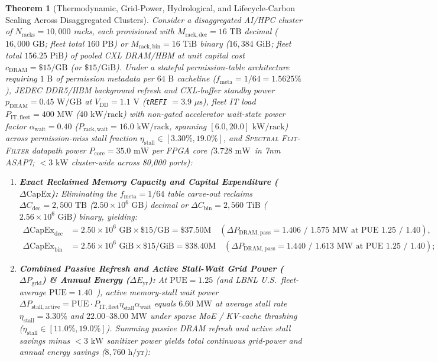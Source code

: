 \documentclass[10pt,twocolumn]{article}
\providecommand{\AsicTotalPowerMw}{\ensuremath{3.728\text{~mW}}}
\theoremstyle{spectralthm}
\newtheorem{theorem}{Theorem}[section]
\begin{document}
\begin{theorem}[Thermodynamic, Grid-Power, Hydrological, and Lifecycle-Carbon Scaling Across Disaggregated Clusters]
\label{thm:thermo_env}
\label{thm:cluster_thermodynamics}
Consider a disaggregated AI/HPC cluster of $N_{\mathrm{racks}} = 10,000$ racks, each provisioned with $M_{\mathrm{rack,dec}} = 16\text{~TB}$ decimal ($16,000\text{~GB}$; fleet total $160\text{~PB}$) or $M_{\mathrm{rack,bin}} = 16\text{~TiB}$ binary ($16,384\text{~GiB}$; fleet total $156.25\text{~PiB}$) of pooled CXL DRAM/HBM at unit capital cost $c_{\mathrm{DRAM}} = \$15/\text{GB}$ (or $\$15/\text{GiB}$). Under a stateful permission-table architecture requiring $1\text{~B}$ of permission metadata per $64\text{~B}$ cacheline ($f_{\mathrm{meta}} = 1/64 = 1.5625\%$), JEDEC DDR5/HBM background refresh and CXL-buffer standby power $p_{\mathrm{DRAM}} = 0.45\text{~W/GB}$ at $V_{\mathrm{DD}} = 1.1\text{~V}$ (\texttt{tREFI} $= 3.9\text{~}\mu\text{s}$), fleet IT load $P_{\mathrm{IT,fleet}} = 400\text{~MW}$ ($40\text{~kW/rack}$) with non-gated accelerator wait-state power factor $\alpha_{\mathrm{wait}} = 0.40$ ($P_{\mathrm{rack,wait}} = 16.0\text{~kW/rack}$, spanning $[6.0, 20.0]\text{~kW/rack}$) across permission-miss stall fraction $\eta_{\mathrm{stall}} \in [3.30\%, 19.0\%]$, and \textsc{Spectral Flit-Filter} datapath power $P_{\mathrm{core}} = 35.0\text{~mW}$ per FPGA core (\AsicTotalPowerMw\ in 7nm ASAP7; $< 3\text{~kW}$ cluster-wide across 80,000 ports):
\begin{enumerate}
  \item[(i)] \textbf{Exact Reclaimed Memory Capacity and Capital Expenditure ($\Delta\mathrm{CapEx}$):} Eliminating the $f_{\mathrm{meta}} = 1/64$ table carve-out reclaims $\Delta C_{\mathrm{dec}} = 2,500\text{~TB}$ ($2.50 \times 10^6\text{~GB}$) decimal or $\Delta C_{\mathrm{bin}} = 2,560\text{~TiB}$ ($2.56 \times 10^6\text{~GiB}$) binary, yielding:
  \begin{align}
  \Delta\mathrm{CapEx}_{\mathrm{dec}} &= 2.50\times 10^6\text{~GB} \times \$15/\text{GB} = \$37.50\text{M}\quad(\Delta P_{\mathrm{DRAM,pass}} = 1.406\text{ / }1.575\text{ MW at PUE }1.25\text{ / }1.40), \label{eq:tco_dec}\\
  \Delta\mathrm{CapEx}_{\mathrm{bin}} &= 2.56\times 10^6\text{~GiB} \times \$15/\text{GiB} = \$38.40\text{M}\quad(\Delta P_{\mathrm{DRAM,pass}} = 1.440\text{ / }1.613\text{ MW at PUE }1.25\text{ / }1.40); \label{eq:tco_bin}
  \end{align}
  \item[(ii)] \textbf{Combined Passive Refresh and Active Stall-Wait Grid Power ($\Delta P_{\mathrm{grid}}$) \& Annual Energy ($\Delta E_{\mathrm{yr}}$):} At $\mathrm{PUE} = 1.25$ (and LBNL U.S.\ fleet-average $\mathrm{PUE} = 1.40$~\cite{shehabi2024lbnl}), active memory-stall wait power $\Delta P_{\mathrm{stall,active}} = \mathrm{PUE} \cdot P_{\mathrm{IT,fleet}} \eta_{\mathrm{stall}} \alpha_{\mathrm{wait}}$ equals $6.60\text{~MW}$ at average stall rate $\eta_{\mathrm{stall}} = 3.30\%$ and $22.00$--$38.00\text{~MW}$ under sparse MoE / KV-cache thrashing ($\eta_{\mathrm{stall}} \in [11.0\%, 19.0\%]$). Summing passive DRAM refresh and active stall savings minus $<3\text{~kW}$ sanitizer power yields total continuous grid-power and annual energy savings ($8,760\text{~h/yr}$):

\end{enumerate}
\end{theorem}
\end{document}

